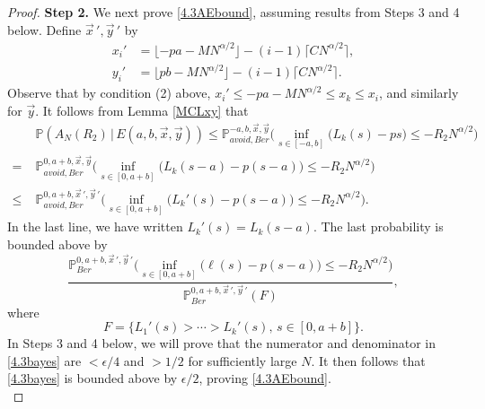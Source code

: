 \begin{proof}
		\noindent\textbf{Step 2.} We next prove \eqref{4.3AEbound}, assuming results from Steps 3 and 4 below. Define $\vec{x}\,',\vec{y}\,'$ by
		\begin{align*}
		x_i' &= \lfloor - pa - MN^{\alpha/2}\rfloor - (i-1)\lceil CN^{\alpha/2}\rceil,\\
		y_i' &= \lfloor pb - MN^{\alpha/2}\rfloor - (i-1)\lceil CN^{\alpha/2}\rceil.
		\end{align*}  
		Observe that by condition (2) above, $x_i'\leq -pa - MN^{\alpha/2} \leq x_k \leq x_i$, and similarly for $\vec{y}$. It follows from Lemma \ref{MCLxy} that
		\begin{align}
		&\mathbb{P}(A_N(R_2)\,|\,E(a,b,\vec{x},\vec{y})) \leq \mathbb{P}^{-a,b, \vec{x}, \vec{y}}_{avoid, Ber} \Big( \inf_{s\in[-a, b]} \big(L_k(s) - ps\big) \leq -R_2N^{\alpha/2} \Big) \label{4.3main}\\
		= \; & \mathbb{P}^{0, a+b, \vec{x}, \vec{y}}_{avoid, Ber} \Big( \inf_{s\in[0,a+b]} \big(L_k(s-a) - p(s-a)\big) \leq -R_2N^{\alpha/2} \Big) \nonumber\\
		\leq \; & \mathbb{P}^{0, a+b, \vec{x}\,', \vec{y}\,'}_{avoid, Ber} \Big( \inf_{s\in[0,a+b]} \big(L_k'(s) - p(s-a)\big) \leq -R_2N^{\alpha/2} \Big) \nonumber.
		\end{align}
		In the last line, we have written $L_k'(s) = L_k(s-a)$. The last probability is bounded above by
		\begin{equation}\label{4.3bayes}
		\frac{\mathbb{P}^{0, a+b, \vec{x}\,', \vec{y}\,'}_{Ber} \Big( \inf_{s\in[0,a+b]} \big(\ell(s) - p(s-a)\big) \leq -R_2 N^{\alpha/2} \Big)}{\mathbb{P}^{0, a+b, \vec{x}\,', \vec{y}\,'}_{Ber}(F)},
		\end{equation}
		where
		\[
		F = \{L_1'(s) > \cdots > L_k'(s), \,s\in [0, a+b]\}.
		\]
		In Steps 3 and 4 below, we will prove that the numerator and denominator in \eqref{4.3bayes} are $<\epsilon/4$ and $>1/2$ for sufficiently large $N$. It then follows that \eqref{4.3bayes} is bounded above by $\epsilon/2$, proving \eqref{4.3AEbound}.\\
		

\end{proof}
